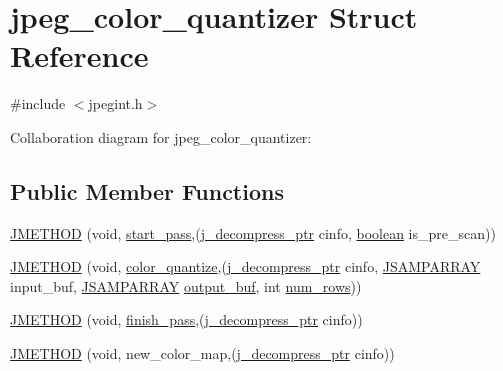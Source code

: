 \hypertarget{structjpeg__color__quantizer}{}\section{jpeg\+\_\+color\+\_\+quantizer Struct Reference}
\label{structjpeg__color__quantizer}


{\ttfamily \#include $<$jpegint.\+h$>$}



Collaboration diagram for jpeg\+\_\+color\+\_\+quantizer\+:
\subsection*{Public Member Functions}
\begin{DoxyCompactItemize}
\item 
\mbox{\hyperlink{structjpeg__color__quantizer_a3296d9d04a267c50808154ce6bdcef1b}{J\+M\+E\+T\+H\+OD}} (void, \mbox{\hyperlink{jddctmgr_8c_a1964f006adb8fb80f57e455f6452aec1}{start\+\_\+pass}},(\mbox{\hyperlink{jpeglib_8h_a00c7d78af44bd26a901c791ccfc1e178}{j\+\_\+decompress\+\_\+ptr}} cinfo, \mbox{\hyperlink{jmorecfg_8h_a7c6368b321bd9acd0149b030bb8275ed}{boolean}} is\+\_\+pre\+\_\+scan))
\item 
\mbox{\hyperlink{structjpeg__color__quantizer_ac11184c8e0fdc9c0ec200c0fab197b5f}{J\+M\+E\+T\+H\+OD}} (void, \mbox{\hyperlink{jquant1_8c_a7cd0ab37d067e082d52761a72a34f393}{color\+\_\+quantize}},(\mbox{\hyperlink{jpeglib_8h_a00c7d78af44bd26a901c791ccfc1e178}{j\+\_\+decompress\+\_\+ptr}} cinfo, \mbox{\hyperlink{jpeglib_8h_ac9d5d1b829ed51769db69a37271a7e91}{J\+S\+A\+M\+P\+A\+R\+R\+AY}} input\+\_\+buf, \mbox{\hyperlink{jpeglib_8h_ac9d5d1b829ed51769db69a37271a7e91}{J\+S\+A\+M\+P\+A\+R\+R\+AY}} \mbox{\hyperlink{jdct_8h_ad7e4660a191b1a791748dd44d5a7a0ec}{output\+\_\+buf}}, int \mbox{\hyperlink{jpegint_8h_ac5f8b57092da0f421713ba171c4c9f87}{num\+\_\+rows}}))
\item 
\mbox{\hyperlink{structjpeg__color__quantizer_abb5268c27447bc9ae1876c5fffa94081}{J\+M\+E\+T\+H\+OD}} (void, \mbox{\hyperlink{jcarith_8c_a3098c13232c4cb8675f1f35a80aa5944}{finish\+\_\+pass}},(\mbox{\hyperlink{jpeglib_8h_a00c7d78af44bd26a901c791ccfc1e178}{j\+\_\+decompress\+\_\+ptr}} cinfo))
\item 
\mbox{\hyperlink{structjpeg__color__quantizer_a9531395d8c6f914f57bea01ff2b2c5b4}{J\+M\+E\+T\+H\+OD}} (void, new\+\_\+color\+\_\+map,(\mbox{\hyperlink{jpeglib_8h_a00c7d78af44bd26a901c791ccfc1e178}{j\+\_\+decompress\+\_\+ptr}} cinfo))
\end{DoxyCompactItemize}


